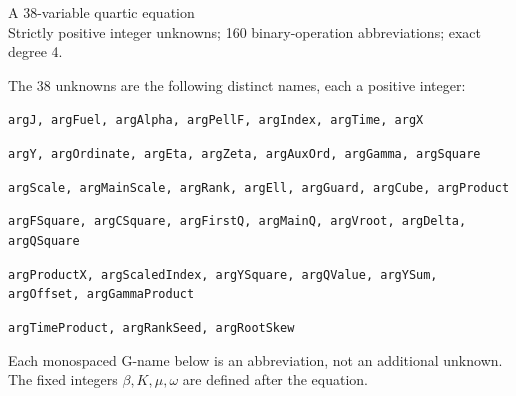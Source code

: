 \documentclass[10pt]{article}
\begin{document}
\begin{center}{\Large A 38-variable quartic equation}\\
Strictly positive integer unknowns; 160 binary-operation abbreviations; exact degree 4.
\end{center}
The 38 unknowns are the following distinct names, each a positive integer:
\par\small
\noindent\texttt{argJ, argFuel, argAlpha, argPellF, argIndex, argTime, argX}\par
\noindent\texttt{argY, argOrdinate, argEta, argZeta, argAuxOrd, argGamma, argSquare}\par
\noindent\texttt{argScale, argMainScale, argRank, argEll, argGuard, argCube, argProduct}\par
\noindent\texttt{argFSquare, argCSquare, argFirstQ, argMainQ, argVroot, argDelta, argQSquare}\par
\noindent\texttt{argProductX, argScaledIndex, argYSquare, argQValue, argYSum, argOffset, argGammaProduct}\par
\noindent\texttt{argTimeProduct, argRankSeed, argRootSkew}\par
\normalsize
Each monospaced G-name below is an abbreviation, not an additional unknown.
The fixed integers $\beta,K,\mu,\omega$ are defined after the equation.
\end{document}
